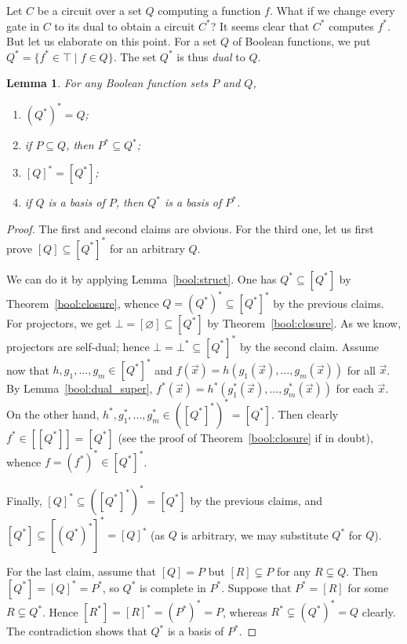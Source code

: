 \documentclass[12pt,notitlepage]{article}
\theoremstyle{plain}
\newtheorem{lemma}[thm]{Lemma}
\theoremstyle{definition}
\theoremstyle{plain}
\newcommand{\sbs}{\subseteq}
\newcommand{\void}{\varnothing}
\newcommand{\1}{\mathbf{1}}
\newcommand{\0}{\mathbf{0}}
\begin{document}
Let $C$ be a circuit over a set $Q$ computing a function $f$. What if we change every gate in $C$ to its dual to obtain a circuit $C^*$? It seems clear that $C^*$ computes $f^*$. But let us elaborate on this point. For a set $Q$ of Boolean functions, we put $Q^* = \{ f^* \in \top \mid f \in Q \}$. The set $Q^*$ is thus \emph{dual} to $Q$.
\begin{lemma}\label{bool:dual_closure} For any Boolean function sets $P$ and $Q$,
\begin{enumerate}
\item $(Q^*)^* = Q$;
\item if $P \sbs Q$, then $P^* \sbs Q^*$;
\item $[Q]^* = [Q^*]$;
\item if $Q$ is a basis of $P$, then $Q^*$ is a basis of $P^*$.
\end{enumerate}
\end{lemma}
\begin{proof}
The first and second claims are obvious. For the third one, let us first prove $[Q] \sbs [Q^*]^*$ for an arbitrary $Q$.

We can do it by applying Lemma~\ref{bool:struct}. One has $Q^* \sbs [Q^*]$ by Theorem~\ref{bool:closure}, whence $Q = (Q^*)^* \sbs [Q^*]^*$ by the previous claims. For projectors, we get $\bot = [\void] \sbs [Q^*]$ by Theorem~\ref{bool:closure}. As we know, projectors are self-dual; hence $\bot = \bot^* \sbs [Q^*]^*$ by the second claim. Assume now that $h, g_1, \ldots, g_m \in [Q^*]^*$ and $f(\vec x) = h(g_1(\vec x),\ldots, g_m(\vec x))$ for all $\vec x$. By Lemma~\ref{bool:dual_super}, $f^*(\vec x) = h^*(g^*_1(\vec x),\ldots, g^*_m(\vec x))$ for each $\vec x$. On the other hand, $h^*, g^*_1, \ldots, g^*_m \in ([Q^*]^*)^* = [Q^*]$. Then clearly $f^* \in [[Q^*]] = [Q^*]$ (see the proof of Theorem~\ref{bool:closure} if in doubt), whence $f = (f^*)^* \in [Q^*]^*$.

Finally, $[Q]^* \sbs ([Q^*]^*)^* = [Q^*]$ by the previous claims, and $[Q^*] \sbs [(Q^*)^*]^* = [Q]^*$ (as $Q$ is arbitrary, we may substitute $Q^*$ for $Q$).

For the last claim, assume that $[Q] = P$ but $[R] \subsetneq P$ for any $R \subsetneq Q$. Then $[Q^*] = [Q]^* = P^*$, so $Q^*$ is complete in $P^*$. Suppose that $P^* = [R]$ for some $R \subsetneq Q^*$. Hence $[R^*] = [R]^* = (P^*)^* = P$, whereas $R^* \subsetneq (Q^*)^* = Q$ clearly. The contradiction shows that $Q^*$ is a basis of $P^*$.
\end{proof}
\end{document}
